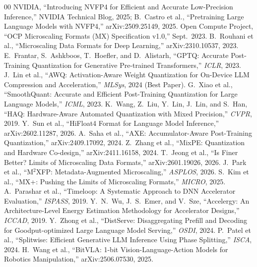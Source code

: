 \documentclass[conference]{IEEEtran}
\begin{document}
\newpage

\begin{thebibliography}{00}
 NVIDIA, ``Introducing NVFP4 for Efficient and Accurate Low-Precision Inference,'' NVIDIA Technical Blog, 2025; B.~Castro et al., ``Pretraining Large Language Models with NVFP4,'' arXiv:2509.25149, 2025.
 Open Compute Project, ``OCP Microscaling Formats (MX) Specification v1.0,'' Sept.~2023.
 B.~Rouhani et al., ``Microscaling Data Formats for Deep Learning,'' arXiv:2310.10537, 2023.
 E.~Frantar, S.~Ashkboos, T.~Hoefler, and D.~Alistarh, ``GPTQ: Accurate Post-Training Quantization for Generative Pre-trained Transformers,'' \emph{ICLR}, 2023.
 J.~Lin et al., ``AWQ: Activation-Aware Weight Quantization for On-Device LLM Compression and Acceleration,'' \emph{MLSys}, 2024 (Best Paper).
 G.~Xiao et al., ``SmoothQuant: Accurate and Efficient Post-Training Quantization for Large Language Models,'' \emph{ICML}, 2023.
 K.~Wang, Z.~Liu, Y.~Lin, J.~Lin, and S.~Han, ``HAQ: Hardware-Aware Automated Quantization with Mixed Precision,'' \emph{CVPR}, 2019.
 Y.~Sun et al., ``HiFloat4 Format for Language Model Inference,'' arXiv:2602.11287, 2026.
 A.~Saha et al., ``AXE: Accumulator-Aware Post-Training Quantization,'' arXiv:2409.17092, 2024.
 Z.~Zhang et al., ``MixPE: Quantization and Hardware Co-design,'' arXiv:2411.16158, 2024.
 T.~Jeong et al., ``Is Finer Better? Limits of Microscaling Data Formats,'' arXiv:2601.19026, 2026.
 J.~Park et al., ``M$^2$XFP: Metadata-Augmented Microscaling,'' \emph{ASPLOS}, 2026.
 S.~Kim et al., ``MX+: Pushing the Limits of Microscaling Formats,'' \emph{MICRO}, 2025.
 A.~Parashar et al., ``Timeloop: A Systematic Approach to DNN Accelerator Evaluation,'' \emph{ISPASS}, 2019.
 Y.~N.~Wu, J.~S.~Emer, and V.~Sze, ``Accelergy: An Architecture-Level Energy Estimation Methodology for Accelerator Designs,'' \emph{ICCAD}, 2019.
 Y.~Zhong et al., ``DistServe: Disaggregating Prefill and Decoding for Goodput-optimized Large Language Model Serving,'' \emph{OSDI}, 2024.
 P.~Patel et al., ``Splitwise: Efficient Generative LLM Inference Using Phase Splitting,'' \emph{ISCA}, 2024.
 H.~Wang et al., ``BitVLA: 1-bit Vision-Language-Action Models for Robotics Manipulation,'' arXiv:2506.07530, 2025.
\end{thebibliography}
\end{document}
